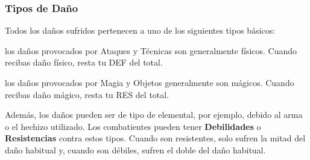 \subsubsection*{Tipos de Daño} 
Todos los daños sufridos pertenecen a uno de los siguientes tipos básicos:
%
\begin{description}[leftmargin=*]
 \item[\accf{Físico}:] los daños provocados por Ataques y Técnicas son generalmente físicos. Cuando recibas daño físico, resta tu DEF del total.
  
 \item[\accf{Mágico}:] los daños provocados por Magia y Objetos generalmente son mágicos. Cuando recibas daño mágico, resta tu RES del total.
\end{description}
%
\noindent
Además, los daños pueden ser de tipo de elemental, por ejemplo, debido al arma o el hechizo utilizado. Los combatientes pueden tener \textbf{Debilidades }o \textbf{Resistencias }contra estos tipos. Cuando son resistentes, solo sufren la mitad del daño habitual y, cuando son débiles, sufren el doble del daño habitual. 
%
\vspace{0.1cm}
%
